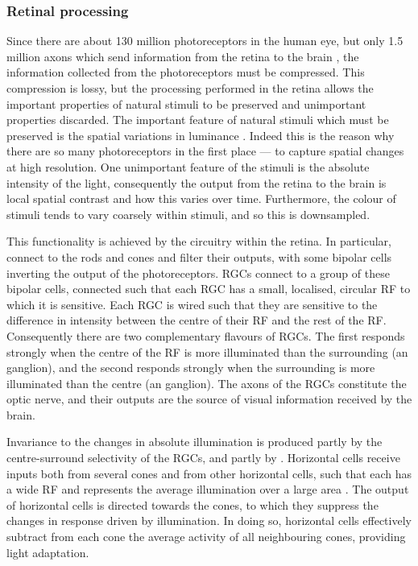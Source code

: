 \subsubsection{Retinal processing}

Since there are about \num{130} million photoreceptors in the human eye, but only \num{1.5} million axons which send information from the retina to the brain \citep{Nassi2009}, the information collected from the photoreceptors must be compressed.
This compression is lossy, but the processing performed in the retina allows the important properties of natural stimuli to be preserved and unimportant properties discarded.
The important feature of natural stimuli which must be preserved is the spatial variations in luminance \citep[Chapter~11]{nsbook}.
Indeed this is the reason why there are so many photoreceptors in the first place --- to capture spatial changes at high resolution.
One unimportant feature of the stimuli is the absolute intensity of the light, consequently the output from the retina to the brain is local spatial contrast and how this varies over time.
Furthermore, the colour of stimuli tends to vary coarsely within stimuli, and so this is downsampled.

This functionality is achieved by the circuitry within the retina.
In particular,  connect to the rods and cones and filter their outputs, with some bipolar cells inverting the output of the photoreceptors.
\acp{RGC} connect to a group of these bipolar cells, connected such that each \ac{RGC} has a small, localised, circular \ac{RF} to which it is sensitive.
Each \ac{RGC} is wired such that they are sensitive to the difference in intensity between the centre of their \ac{RF} and the rest of the \ac{RF}.
Consequently there are two complementary flavours of \acp{RGC}.
The first responds strongly when the centre of the \ac{RF} is more illuminated than the surrounding (an  ganglion), and the second responds strongly when the surrounding is more illuminated than the centre (an  ganglion).
The axons of the \acp{RGC} constitute the optic nerve, and their outputs are the source of visual information received by the brain.

Invariance to the changes in absolute illumination is produced partly by the centre-surround selectivity of the \acp{RGC}, and partly by .
Horizontal cells receive inputs both from several cones and from other horizontal cells, such that each has a wide \ac{RF} and represents the average illumination over a large area \citep[Chapter~11]{nsbook}.
The output of horizontal cells is directed towards the cones, to which they suppress the changes in response driven by illumination.
In doing so, horizontal cells effectively subtract from each cone the average activity of all neighbouring cones, providing light adaptation.

